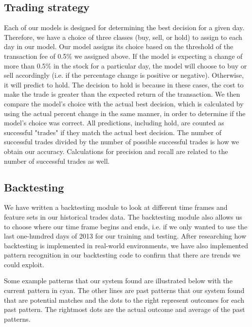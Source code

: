 \documentclass{article}
\begin{document}
\subsection{Trading strategy}
Each of our models is designed for determining the best decision for a given day. Therefore, we have a choice of three classes (buy, sell, or hold) to assign to each day in our model. Our model assigns its choice based on the threshold of the transaction fee of 0.5\% we assigned above. If the model is expecting a change of more than 0.5\% in the stock for a particular day, the model will choose to buy or sell accordingly (i.e. if the percentage change is positive or negative). Otherwise, it will predict to hold. The decision to hold is because in these cases, the cost to make the trade is greater than the expected return of the transaction. We then compare the model's choice with the actual best decision, which is calculated by using the actual percent change in the same manner, in order to determine if the model's choice was correct. All predictions, including hold, are counted as successful "trades" if they match the actual best decision. The number of successful trades divided by the number of possible successful trades is how we obtain our accuracy. Calculations for precision and recall are related to the number of successful trades as well.

\subsection{Backtesting}
We have written a backtesting module to look at different time frames and feature sets in our historical trades data. The backtesting module also allows us to choose where our time frame begins and ends, i.e. if we only wanted to use the last one-hundred days of 2013 for our training and testing. After researching how backtesting is implemented in real-world environments, we have also implemented pattern recognition in our backtesting code to confirm that there are trends we could exploit.

Some example patterns that our system found are illustrated below with the current pattern in cyan. The other lines are past patterns that our system found that are potential matches and the dots to the right represent outcomes for each past pattern.  The rightmost dots are the actual outcome and average of the past patterns.
\end{document}
